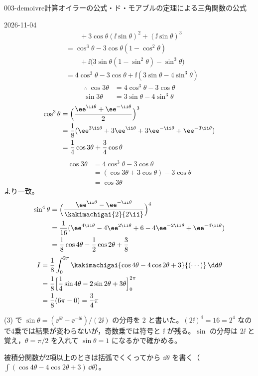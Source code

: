 \documentclass[uplatex,dvipdfmx,a4paper,11pt]{jsarticle}
\begin{document}
\begin{mondai}{003-demoivre}{計算}{オイラーの公式・ド・モアブルの定理による三角関数の公式}
\begin{kotaeutsushi}{2026-11-04}
\begin{align*}
&\qquad+3\cos\theta(\ii\sin\theta)^{2}+(\ii\sin\theta)^{3}\\
&=\cos^{3}\theta-3\cos\theta(1-\cos^{2}\theta)\\
&\qquad+\ii\bigl(3\sin\theta(1-\sin^{2}\theta)-\sin^{3}\theta\bigr)\\
&=4\cos^{3}\theta-3\cos\theta+\ii(3\sin\theta-4\sin^{3}\theta)
\end{align*}
\begin{align*}
\therefore\ \cos3\theta&=4\cos^{3}\theta-3\cos\theta\\
\sin3\theta&=3\sin\theta-4\sin^{3}\theta
\end{align*}
\begin{align*}
\cos^{3}\theta&=\Bigl(\frac{\ee^{\ii\theta}+\ee^{-\ii\theta}}{2}\Bigr)^{3}\\
&=\frac{1}{8}(\ee^{3\ii\theta}+3\ee^{\ii\theta}+3\ee^{-\ii\theta}+\ee^{-3\ii\theta})\\
&=\frac{1}{4}\cos3\theta+\frac{3}{4}\cos\theta
\end{align*}
\begin{align*}
\cos3\theta&=4\cos^{3}\theta-3\cos\theta\\
&=(\cos3\theta+3\cos\theta)-3\cos\theta\\
&=\cos3\theta
\end{align*}
より一致。
\begin{align*}
\sin^{4}\theta&=\Bigl(\frac{\ee^{\ii\theta}-\ee^{-\ii\theta}}{\kakimachigai{2}{2\ii}}\Bigr)^{4}\\
&=\frac{1}{16}(\ee^{4\ii\theta}-4\ee^{2\ii\theta}+6-4\ee^{-2\ii\theta}+\ee^{-4\ii\theta})\\
&=\frac{1}{8}\cos4\theta-\frac{1}{2}\cos2\theta+\frac{3}{8}
\end{align*}
\begin{align*}
I&=\frac{1}{8}\int_{0}^{2\pi}\kakimachigai{\cos4\theta-4\cos2\theta+3}{(\cdots)}\,\dd\theta\\
&=\frac{1}{8}\Bigl[\frac{1}{4}\sin4\theta-2\sin2\theta+3\theta\Bigr]_{0}^{2\pi}\\
&=\frac{1}{8}(6\pi-0)=\frac{3}{4}\pi
\end{align*}
\end{kotaeutsushi}
\begin{kizuki}
\item (3) で $\sin\theta=(\ee^{\ii\theta}-\ee^{-\ii\theta})/(2\ii)$ の分母を $2$ と書いた。$(2\ii)^{4}=16=2^{4}$ なので4乗では結果が変わらないが，奇数乗では符号と $\ii$ が残る。$\sin$ の分母は $2\ii$ と覚え，$\theta=\pi/2$ を入れて $\sin\theta=1$ になるかで確かめる。
\item 被積分関数が2項以上のときは括弧でくくってから $\dd\theta$ を書く（$\int(\cos4\theta-4\cos2\theta+3)\,\dd\theta$）。
\end{kizuki}
\end{mondai}
\end{document}
